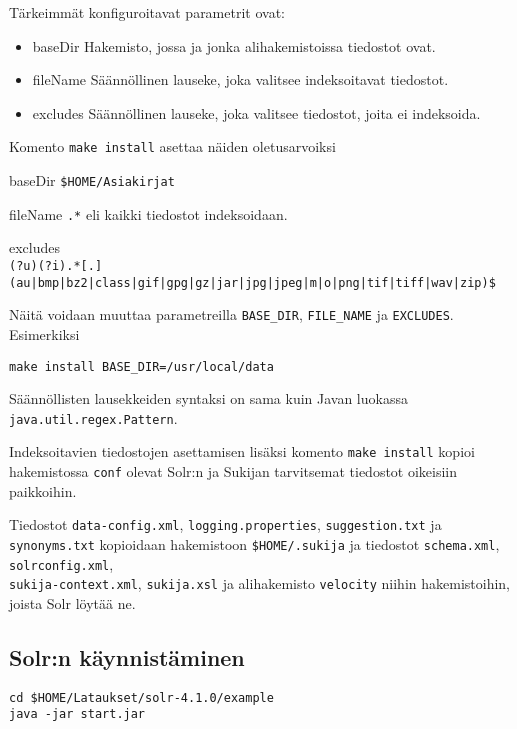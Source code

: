 \documentclass[12pt,a4paper]{scrartcl}
\begin{document}
Tärkeimmät konfiguroitavat parametrit ovat:

\begin{itemize}
\item baseDir
Hakemisto, jossa ja jonka alihakemistoissa tiedostot ovat.

\item fileName
Säännöllinen lauseke, joka valitsee indeksoitavat tiedostot.

\item excludes
Säännöllinen lauseke, joka valitsee tiedostot, joita ei indeksoida.
\end{itemize}

Komento \verb|make install| asettaa näiden oletusarvoiksi

baseDir \verb|$HOME/Asiakirjat|

fileName \verb|.*| eli kaikki tiedostot indeksoidaan.

excludes \\
{\footnotesize \verb+(?u)(?i).*[.](au|bmp|bz2|class|gif|gpg|gz|jar|jpg|jpeg|m|o|png|tif|tiff|wav|zip)$+}


Näitä voidaan muuttaa parametreilla \verb|BASE_DIR|,
\verb|FILE_NAME| ja
\verb|EXCLUDES|. Esimerkiksi

\verb|make install BASE_DIR=/usr/local/data|

Säännöllisten lausekkeiden syntaksi on sama kuin Javan luokassa \\
\verb=java.util.regex.Pattern=.

Indeksoitavien tiedostojen asettamisen lisäksi komento
\verb=make install= kopioi hakemistossa \verb=conf= olevat Solr:n ja
Sukijan tarvitsemat tiedostot oikeisiin paikkoihin.

Tiedostot
\verb=data-config.xml=,
\verb=logging.properties=,
\verb=suggestion.txt= ja
\verb=synonyms.txt=
kopioidaan hakemistoon \verb=$HOME/.sukija=
ja tiedostot
\verb=schema.xml=,
\verb=solrconfig.xml=, \\
\verb=sukija-context.xml=,
\verb=sukija.xsl= ja
alihakemisto \verb=velocity=
niihin hakemistoihin, joista Solr löytää ne.


\subsection*{Solr:n käynnistäminen}

\begin{verbatim}
cd $HOME/Lataukset/solr-4.1.0/example
java -jar start.jar
\end{verbatim}
\end{document}
